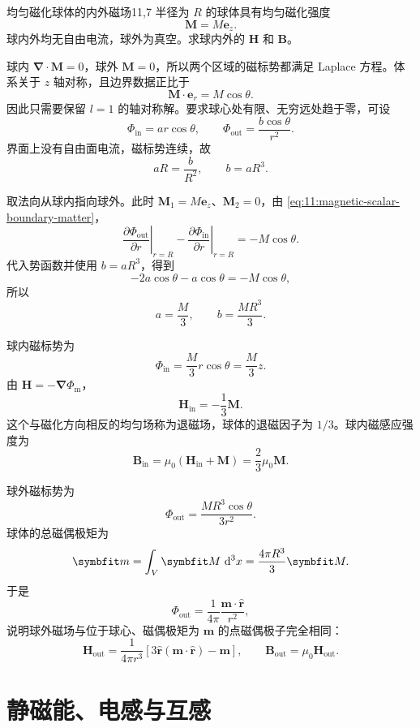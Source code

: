 \begin{example}{均匀磁化球体的内外磁场}{11,7}
	半径为 $R$ 的球体具有均匀磁化强度
	\[
	\bm{M}=M\bm{e}_{z}.
	\]
	球内外均无自由电流，球外为真空。求球内外的 $\bm{H}$ 和 $\bm{B}$。

	\begin{solution}
		球内 $\bm{\nabla}\cdot\bm{M}=0$，球外 $\bm{M}=0$，所以两个区域的磁标势都满足 Laplace 方程。体系关于 $z$ 轴对称，且边界数据正比于
		\[
		\bm{M}\cdot\bm{e}_{r}
		=
		M\cos\theta.
		\]
		因此只需要保留 $l=1$ 的轴对称解。要求球心处有限、无穷远处趋于零，可设
		\[
		\Phi_{\mathrm{in}}
		=
		a r\cos\theta,
		\qquad
		\Phi_{\mathrm{out}}
		=
		\frac{b\cos\theta}{r^{2}}.
		\]
		界面上没有自由面电流，磁标势连续，故
		\[
		aR
		=
		\frac{b}{R^{2}},
		\qquad
		b=aR^{3}.
		\]

		取法向从球内指向球外。此时
		$\bm{M}_{1}=M\bm{e}_{z}$、$\bm{M}_{2}=0$，由
		\eqref{eq:11:magnetic-scalar-boundary-matter}，
		\[
		\left.
		\frac{\partial\Phi_{\mathrm{out}}}{\partial r}
		\right|_{r=R}
		-
		\left.
		\frac{\partial\Phi_{\mathrm{in}}}{\partial r}
		\right|_{r=R}
		=
		-M\cos\theta.
		\]
		代入势函数并使用 $b=aR^{3}$，得到
		\[
		-2a\cos\theta-a\cos\theta
		=
		-M\cos\theta,
		\]
		所以
		\[
		a=\frac{M}{3},
		\qquad
		b=\frac{MR^{3}}{3}.
		\]

		球内磁标势为
		\[
		\Phi_{\mathrm{in}}
		=
		\frac{M}{3}r\cos\theta
		=
		\frac{M}{3}z.
		\]
		由 $\bm{H}=-\bm{\nabla}\Phi_{\mathrm{m}}$，
		\[
		\bm{H}_{\mathrm{in}}
		=
		-\frac{1}{3}\bm{M}.
		\]
		这个与磁化方向相反的均匀场称为退磁场，球体的退磁因子为 $1/3$。球内磁感应强度为
		\[
		\bm{B}_{\mathrm{in}}
		=
		\mu_{0}
		(\bm{H}_{\mathrm{in}}+\bm{M})
		=
		\frac{2}{3}\mu_{0}\bm{M}.
		\]

		球外磁标势为
		\[
		\Phi_{\mathrm{out}}
		=
		\frac{MR^{3}\cos\theta}{3r^{2}}.
		\]
		球体的总磁偶极矩为
		\[
		\bm{m}
		=
		\int_{V}\bm{M}\,\dif^{3}x
		=
		\frac{4\pi R^{3}}{3}\bm{M}.
		\]
		于是
		\[
		\Phi_{\mathrm{out}}
		=
		\frac{1}{4\pi}
		\frac{\bm{m}\cdot\hat{\bm{r}}}{r^{2}},
		\]
		说明球外磁场与位于球心、磁偶极矩为 $\bm{m}$ 的点磁偶极子完全相同：
		\[
		\bm{H}_{\mathrm{out}}
		=
		\frac{1}{4\pi r^{3}}
		\left[
		3\hat{\bm{r}}
		(\bm{m}\cdot\hat{\bm{r}})
		-
		\bm{m}
		\right],
		\qquad
		\bm{B}_{\mathrm{out}}
		=
		\mu_{0}\bm{H}_{\mathrm{out}}.
		\]
	\end{solution}
\end{example}

\section{静磁能、电感与互感}

